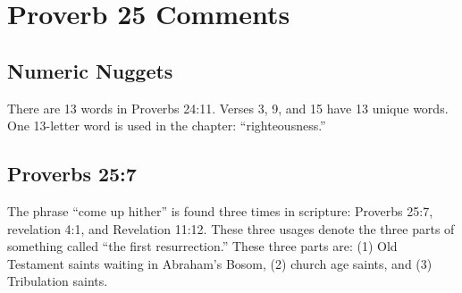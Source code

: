 \section{Proverb 25 Comments}

\subsection{Numeric Nuggets}
There are 13 words in Proverbs 24:11. Verses 3, 9, and 15 have 13 unique words. One 13-letter word is used in the chapter: ``righteousness.''

\subsection{Proverbs 25:7}
The phrase ``come up hither'' is found three times in scripture: Proverbs 25:7, revelation 4:1, and Revelation 11:12.  These three usages denote the three parts of something called ``the first resurrection.'' These three parts are: (1) Old Testament saints waiting in Abraham's Bosom, (2) church age saints, and (3) Tribulation saints. %

